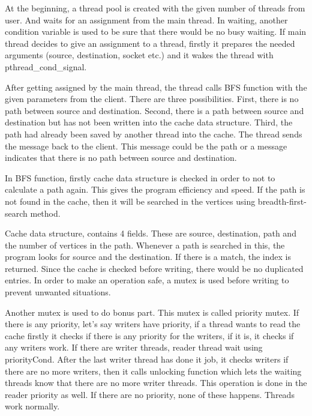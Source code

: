 \documentclass{article}
\begin{document}
\bigbreak
At the beginning, a thread pool is created with the given number of threads from user. And waits for an assignment from
 the main thread. In waiting, another condition variable is used to be sure that there would be no busy waiting. If main 
 thread decides to give an assignment to a thread, firstly it prepares the needed arguments (source, destination, socket 
 etc.) and it wakes the thread with pthread\_cond\_signal. 
\bigbreak

After getting assigned by the main thread, the thread calls BFS function with the given parameters from the client. 
There are three possibilities. First, there is no path between source and destination. Second, there is a path between 
source and destination but has not been written into the cache data structure. Third, the path had already been saved by
 another thread into the cache. The thread sends the message back to the client. This message could be the path or a 
 message indicates that there is no path between source and destination.

\bigbreak
In BFS function, firstly cache data structure is checked in order to not to calculate a path again. This gives the 
program efficiency and speed. If the path is not found in the cache, then it will be searched in the vertices using 
breadth-first-search method.
\bigbreak

Cache data structure, contains 4 fields. These are source, destination, path and the number of vertices in the path.
 Whenever a path is searched in this, the program looks for source and the destination. If there is a match, the index
  is returned. Since the cache is checked before writing, there would be no duplicated entries. In order to make an 
  operation safe, a mutex is used before writing to prevent unwanted situations.

\bigbreak
Another mutex  is used to do bonus part. This mutex is called priority mutex. If there is any priority,  let’s say 
writers have priority, if a thread wants to read the cache firstly it checks if there is any priority for the writers,
 if it is, it checks if any writers work. If there are writer threads, reader thread wait using priorityCond. After the
 last writer thread has done it job, it checks writers if there are no more writers, then it calls unlocking function 
 which lets the waiting threads know that there are no more writer threads. This operation is done in the reader 
 priority as well. If there are no priority, none of these happens. Threads work normally.
\end{document}
